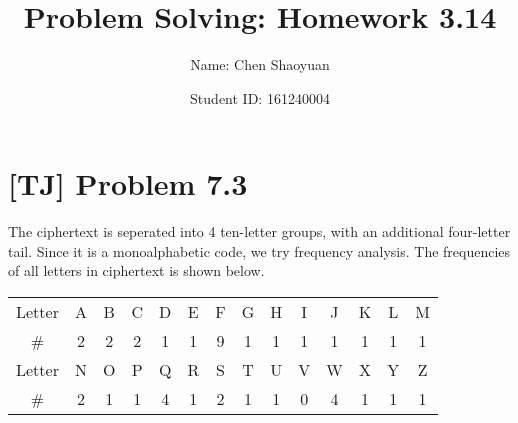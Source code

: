 \documentclass[a4paper,11pt]{article}
\newcommand{\homeworkno}{3.14}
\begin{document}
  \title{Problem Solving: Homework \homeworkno}
  \author{Name: Chen Shaoyuan \and Student ID: 161240004}
  \maketitle

  \section{[TJ] Problem 7.3}
  The ciphertext is seperated into 4 ten-letter groups, with an additional four-letter tail. Since it is a monoalphabetic code, we try frequency analysis. The frequencies of all letters in ciphertext is shown below.

\begin{table}[h]
  \centering
   \begin{tabular}{c|ccccccccccccc}
     \hline
     Letter & A & B & C & D & E & F & G & H & I & J & K & L & M \\
     \# & 2 & 2 & 2 & 1 & 1 & 9 & 1 & 1 & 1 & 1 & 1 & 1 & 1 \\ \hline
     Letter & N & O & P & Q & R & S & T & U & V & W & X & Y & Z \\
     \# & 2 & 1 & 1 & 4 & 1 & 2 & 1 & 1 & 0 & 4 & 1 & 1 & 1 \\
     \hline
   \end{tabular}
\end{table}
\end{document}
